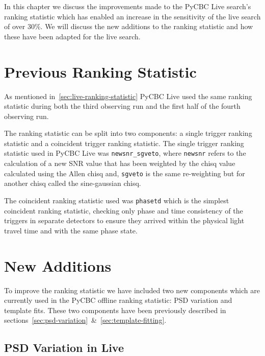 
In this chapter we discuss the improvements made to the PyCBC Live search's ranking statistic which has enabled an increase in the sensitivity of the live search of over 30\%. We will discuss the new additions to the ranking statistic and how these have been adapted for the live search.

\section{\label{live-previous-stat}Previous Ranking Statistic}

As mentioned in~\ref{sec:live-ranking-statistic} PyCBC Live used the same ranking statistic during both the third observing run and the first half of the fourth observing run.

The ranking statistic can be split into two components: a single trigger ranking statistic and a coincident trigger ranking statistic. The single trigger ranking statistic used in PyCBC Live was \verb|newsnr_sgveto|, where \verb|newsnr| refers to the calculation of a new SNR value that has been weighted by the chisq value calculated using the Allen chisq and, \verb|sgveto| is the same re-weighting but for another chisq called the sine-gaussian chisq.

The coincident ranking statistic used was \verb|phasetd| which is the simplest coincident ranking statistic, checking only phase and time consistency of the triggers in separate detectors to ensure they arrived within the physical light travel time and with the same phase state.

\section{\label{live-new-additions}New Additions}

To improve the ranking statistic we have included two new components which are currently used in the PyCBC offline ranking statistic: PSD variation and template fits. These two components have been previously described in sections~\ref{sec:psd-variation}~\&~\ref{sec:template-fitting}.

\subsection{\label{live-psd-var}PSD Variation in Live}

